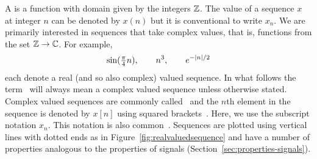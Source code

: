 A  is a function with domain given by the integers ${\mathbb Z}$.  The value of a sequence $x$ at integer $n$ can be denoted by $x(n)$ but it is conventional to write $x_n$.  We are primarily interested in sequences that take complex values, that is, functions from the set ${\mathbb Z} \to {\mathbb C}$.  For example,
\[
\sin( \tfrac{\pi}{4} n), \qquad n^3, \qquad e^{-\vert n \vert/2}
\]
each denote a real (and so also complex) valued sequence.  In what follows the term~ will always mean a complex valued sequence unless otherwise stated.  Complex valued sequences are commonly called~ and the $n$th element in the sequence is denoted by $x[n]$ using squared brackets~\citep{Oppenheiim_sigs_sys_1996}.  Here, we use the subscript notation $x_n$. This notation is also common~\citep{vetterli_fund_sig_proc,Rudin_real_and_complex_analysis}.
Sequences are plotted using vertical lines with dotted ends as in Figure~\ref{fig:realvaluedsequence} and have a number of properties analogous to the properties of signals (Section~\ref{sec:properties-signals}).

